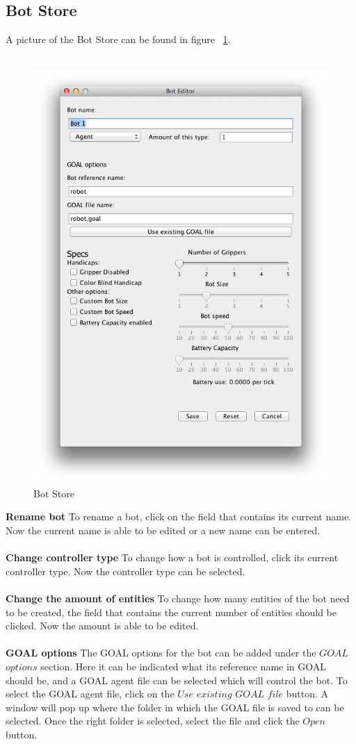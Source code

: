 \subsection{Bot Store}
A picture of the Bot Store can be found in figure ~\ref{fig:bs}.\\\\
\begin{figure}[h]
\begin{center}
\includegraphics[width=0.5\linewidth]{NewFeatures/bs.png}
\end{center}
\caption{Bot Store}
\label{fig:bs}
\end{figure}
\textbf{Rename bot}
To rename a bot, click on the field that contains its current name. Now the current name is able to be edited or a new name can be entered.
\\\\
\textbf{Change controller type}
To change how a bot is controlled, click its current controller type. Now the controller type can be selected.
\\\\
\textbf{Change the amount of entities}
To change how many entities of the bot need to be created, the field that contains the current number of entities should be clicked. Now the amount is able to be edited.
\\\\
\textbf{GOAL options}
The GOAL options for the bot can be added under the $GOAL$ $options$ section. Here it can be indicated what its reference name in GOAL should be, and a GOAL agent file can be selected which will control the bot. To select the GOAL agent file, click on the $Use$ $existing$ $GOAL$ $file$ button. A window will pop up where the folder in which the GOAL file is saved to can be selected. Once the right folder is selected, select the file and click the $Open$ button.
